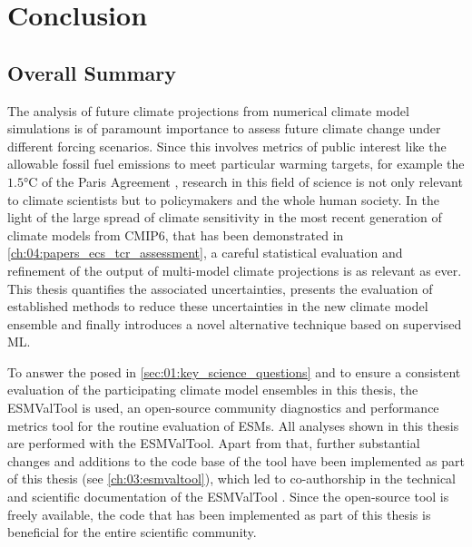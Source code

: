 
%



\chapter{Conclusion}
\label{ch:07:conclusion}


\section{Overall Summary}
\label{sec:07:overall_summary}

The analysis of future climate projections from numerical climate model
simulations is of paramount importance to assess future climate change under
different forcing scenarios. Since this involves metrics of public interest
like the allowable fossil fuel emissions to meet particular warming targets,
for example the $1.5 \unit{\degreeCelsius}$ of the Paris Agreement
\autocite{UNFCCC2015}, research in this field of science is not only relevant
to climate scientists but to policymakers and the whole human society. In the
light of the large spread of climate sensitivity in the most recent generation
of climate models from \acs{CMIP}6, that has been demonstrated in
\cref{ch:04:papers_ecs_tcr_assessment}, a careful statistical evaluation and
refinement of the output of multi-model climate projections is as relevant as
ever. This thesis quantifies the associated uncertainties, presents the
evaluation of established methods to reduce these uncertainties in the new
climate model ensemble and finally introduces a novel alternative technique
based on supervised \ac{ML}.

To answer the  posed in
\cref{sec:01:key_science_questions} and to ensure a consistent evaluation of
the participating climate model ensembles in this thesis, the \ac{ESMValTool}
is used, an open-source community diagnostics and performance metrics tool for
the routine evaluation of \acp{ESM}. All analyses shown in this thesis are
performed with the \ac{ESMValTool}. Apart from that, further substantial
changes and additions to the code base of the tool have been implemented as
part of this thesis (see \cref{ch:03:esmvaltool}), which led to co-authorship
in the technical and scientific documentation of the \ac{ESMValTool}
\autocite{Eyring2020, Lauer2020, Righi2020, Weigel2020}. Since the open-source
tool is freely available, the code that has been implemented as part of this
thesis is beneficial for the entire scientific community.

